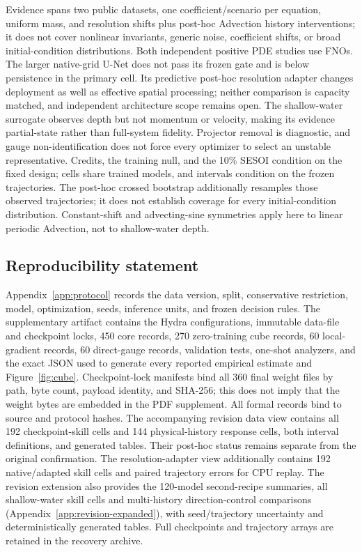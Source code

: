 \documentclass{article}
\begin{document}
Evidence spans two public datasets, one coefficient/scenario per equation, uniform mass, and
resolution shifts plus post-hoc Advection history interventions; it does not cover nonlinear
invariants, generic noise, coefficient shifts, or broad initial-condition distributions. Both independent positive PDE studies use FNOs. The larger native-grid U-Net does not pass its
frozen gate and is below persistence in the primary cell. Its predictive post-hoc resolution
adapter changes deployment as well as effective spatial processing; neither comparison is
capacity matched, and independent architecture scope remains open. The shallow-water
surrogate observes depth but not momentum or velocity, making its evidence partial-state rather
than full-system fidelity. Projector removal is diagnostic, and gauge non-identification does not
force every optimizer to select an unstable representative. Credits, the training null, and the
10\% SESOI condition on the fixed design; cells share trained models, and intervals condition on
the frozen trajectories. The post-hoc crossed bootstrap additionally resamples those observed
trajectories; it does not establish coverage for every initial-condition distribution.
Constant-shift and advecting-sine symmetries apply here to linear periodic Advection, not to
shallow-water depth.

\subsection*{Reproducibility statement}

Appendix~\ref{app:protocol} records the data version, split, conservative restriction, model,
optimization, seeds, inference units, and frozen decision rules. The supplementary artifact
contains the Hydra configurations, immutable data-file and checkpoint locks, 450 core records, 270
zero-training cube records, 60 local-gradient records, 60 direct-gauge records, validation
tests, one-shot analyzers, and the exact JSON used to generate every reported empirical estimate and
Figure~\ref{fig:cube}. Checkpoint-lock manifests bind all 360 final weight files by path, byte count,
payload identity, and SHA-256; this does not imply that the weight bytes are embedded in the PDF
supplement. All formal records bind to source and protocol hashes. The accompanying revision data view
contains all 192 checkpoint-skill cells and 144 physical-history response cells, both interval
definitions, and generated tables. Their post-hoc status remains separate from the original
confirmation. The resolution-adapter view additionally contains 192 native/adapted skill cells and paired trajectory errors for CPU replay. The revision extension also provides the 120-model second-recipe summaries, all shallow-water skill cells and multi-history direction-control comparisons (Appendix~\ref{app:revision-expanded}), with seed/trajectory uncertainty and deterministically generated tables. Full checkpoints and trajectory arrays are retained in the recovery archive.
\end{document}
